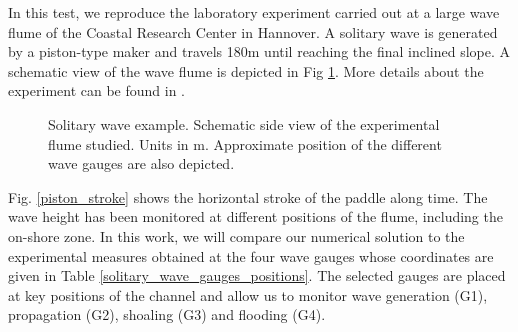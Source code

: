 In this test, we reproduce the laboratory experiment carried out at a large wave flume of the Coastal Research Center in Hannover. A solitary wave is generated by a piston-type maker and travels 180m until reaching the final inclined slope. A schematic view of the wave flume is depicted in Fig \ref{solitary_wave_channel}. More details about the experiment can be found in \cite{krautwald2020,krautwald2022,krautwald2021}.

\begin{figure} [htb]
    \centering
    \caption{Solitary wave example. Schematic side view of the experimental flume studied. Units in m. Approximate position of the different wave gauges are also depicted.}
    \label{solitary_wave_channel}
\end{figure}

Fig. \ref{piston_stroke} shows the horizontal stroke of the paddle along time. The wave height has been monitored at different positions of the flume, including the on-shore zone. In this work, we will compare our numerical solution to the experimental measures obtained at the four wave gauges whose coordinates are given in Table \ref{solitary_wave_gauges_positions}. The selected gauges are placed at key positions of the channel and allow us to monitor wave generation (G1), propagation (G2), shoaling (G3) and flooding (G4).


